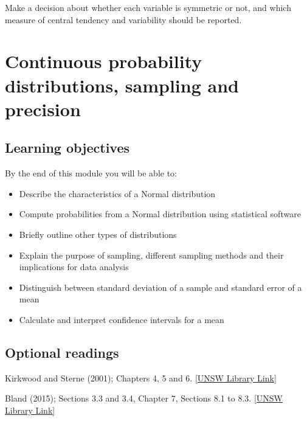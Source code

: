 \documentclass[
  a4paper,
]{memoir}
\providecommand{\tightlist}{%
  \setlength{\itemsep}{0pt}\setlength{\parskip}{0pt}}
\begin{document}
Make a decision about whether each variable is symmetric or not, and
which measure of central tendency and variability should be reported.


\chapter{Continuous probability distributions, sampling and
precision}\label{continuous-probability-distributions-sampling-and-precision}

\section*{Learning objectives}\label{learning-objectives-2}


By the end of this module you will be able to:

\begin{itemize}
\tightlist
\item
  Describe the characteristics of a Normal distribution
\item
  Compute probabilities from a Normal distribution using statistical
  software
\item
  Briefly outline other types of distributions
\item
  Explain the purpose of sampling, different sampling methods and their
  implications for data analysis
\item
  Distinguish between standard deviation of a sample and standard error
  of a mean
\item
  Calculate and interpret confidence intervals for a mean
\end{itemize}

\section*{Optional readings}\label{optional-readings-2}


Kirkwood and Sterne (2001); Chapters 4, 5 and 6.
\href{http://er1.library.unsw.edu.au/er/cgi-bin/eraccess.cgi?url=https://ebookcentral.proquest.com/lib/unsw/detail.action?docID=624728}{{[}UNSW
Library Link{]}}

Bland (2015); Sections 3.3 and 3.4, Chapter 7, Sections 8.1 to 8.3.
\href{http://er1.library.unsw.edu.au/er/cgi-bin/eraccess.cgi?url=https://ebookcentral.proquest.com/lib/unsw/detail.action?docID=5891730}{{[}UNSW
Library Link{]}}
\end{document}
